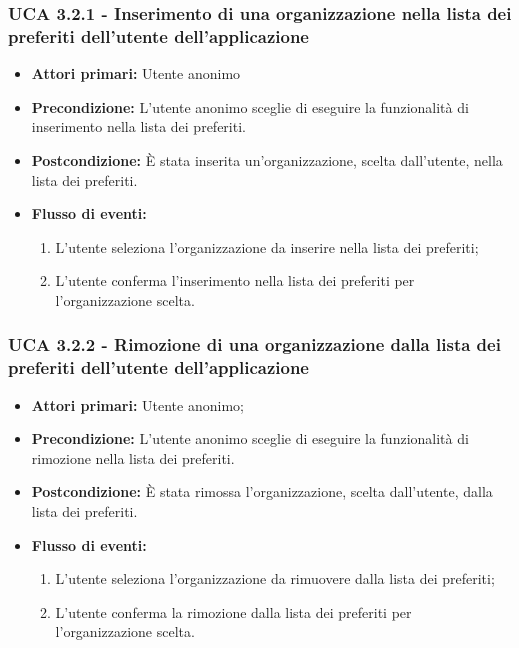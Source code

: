 \subsubsection{UCA 3.2.1 - Inserimento di una organizzazione nella lista dei preferiti dell'utente dell'applicazione}%
\begin{itemize}
	\item \textbf{Attori primari:} Utente anonimo
	\item \textbf{Precondizione:} L'utente anonimo sceglie di eseguire la funzionalità di inserimento nella lista dei preferiti.
	\item \textbf{Postcondizione:} È stata inserita un'organizzazione, scelta dall'utente, nella lista dei preferiti.
	\item \textbf{Flusso di eventi:}
	\begin{enumerate}
		\item L'utente seleziona l'organizzazione da inserire nella lista dei preferiti;
		\item L'utente conferma l'inserimento nella lista dei preferiti per l'organizzazione scelta.
	\end{enumerate}
\end{itemize}

\subsubsection{UCA 3.2.2 - Rimozione di una organizzazione dalla lista dei preferiti dell'utente dell'applicazione}%
\begin{itemize}
	\item \textbf{Attori primari:} Utente anonimo;
	\item \textbf{Precondizione:}  L'utente anonimo sceglie di eseguire la funzionalità di rimozione nella lista dei preferiti.
	\item \textbf{Postcondizione:} È stata rimossa l'organizzazione, scelta dall'utente, dalla lista dei preferiti.
	\item \textbf{Flusso di eventi:}
	\begin{enumerate}
		\item L'utente seleziona l'organizzazione da rimuovere dalla lista dei preferiti;
		\item L'utente conferma la rimozione dalla lista dei preferiti per l'organizzazione scelta.
	\end{enumerate}
\end{itemize}



